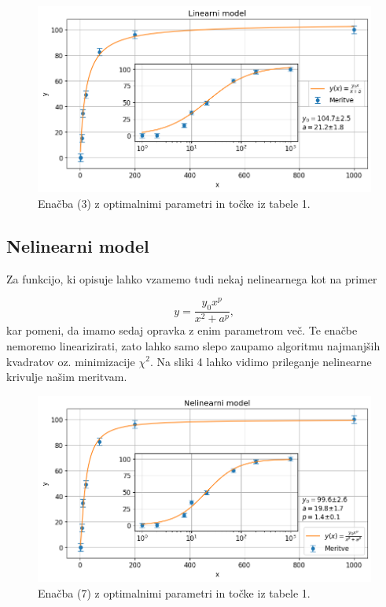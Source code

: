 \documentclass[slovene,11pt,a4paper]{article}
\begin{document}
\begin{figure}[h!]
\centering
\includegraphics[width=13cm]{farma3.png}
\caption{Enačba (3) z optimalnimi parametri in točke iz tabele 1.}
\end{figure}

\subsection{Nelinearni model}

Za funkcijo, ki opisuje lahko vzamemo tudi nekaj nelinearnega kot na primer

\begin{equation}
y = \frac{y_0 x^p}{x^2 + a^p},
\end{equation}
kar pomeni, da imamo sedaj opravka z enim parametrom več. Te enačbe nemoremo linearizirati, zato lahko samo slepo zaupamo algoritmu najmanjših kvadratov oz. minimizacije $\chi^2$. Na sliki 4 lahko vidimo prileganje nelinearne krivulje našim meritvam.

\begin{figure}[h!]
\centering
\includegraphics[width=13cm]{farma4.png}
\caption{Enačba (7) z optimalnimi parametri in točke iz tabele 1.}
\end{figure}
\end{document}
